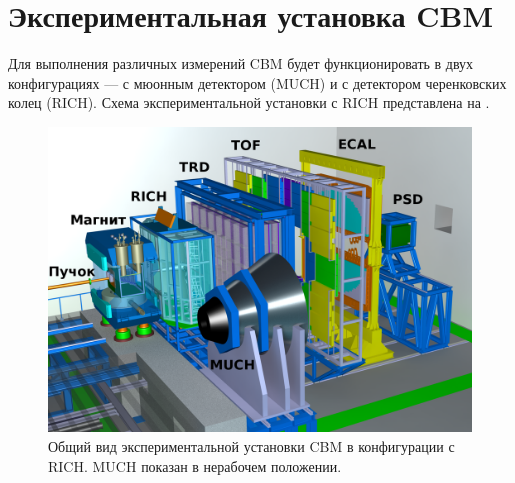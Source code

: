 
\section{Экспериментальная установка CBM}\label{sec:secCbmSetup}



Для выполнения различных измерений CBM будет функционировать в двух конфигурациях --- с мюонным детектором (MUCH) и с детектором черенковских колец (RICH). Схема экспериментальной установки с RICH представлена на .

\begin{figure}[H]
\centering
\includegraphics[width=1.0\textwidth]{pictures/1_CBM_SIS100_with_names.png}
\caption{Общий вид экспериментальной установки CBM в конфигурации с RICH. MUCH показан в нерабочем положении.}
\label{fig:CBM}
\end{figure}

